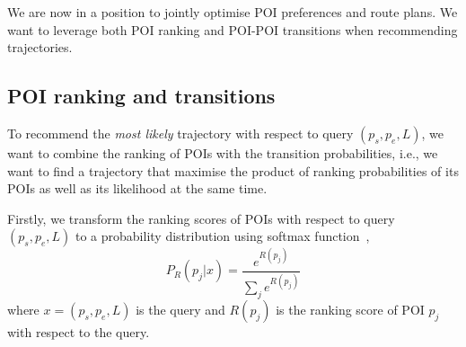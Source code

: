 We are now in a position to jointly optimise POI preferences and route plans.
We want to leverage both POI ranking and POI-POI transitions when recommending trajectories.


\subsection{POI ranking and transitions}
\label{sec:rank+markov}
To recommend the \textit{most likely} trajectory with respect to query $(p_s, p_e, L)$,
we want to combine the ranking of POIs with the transition probabilities,
i.e., we want to find a trajectory that maximise the product of ranking probabilities of its POIs
as well as its likelihood at the same time.

Firstly, we transform the ranking scores of POIs with respect to query $(p_s, p_e, L)$
to a probability distribution using softmax function~\cite{bishop2006},
\begin{equation}
  \label{eq:poi-probability}
  P_R(p_j | x) = \frac{e^{R(p_j)}}{\sum_j e^{R(p_j)}}
\end{equation}
where $x = (p_s, p_e, L)$ is the query and $R(p_j)$ is the ranking score of POI $p_j$ with respect to the query.


